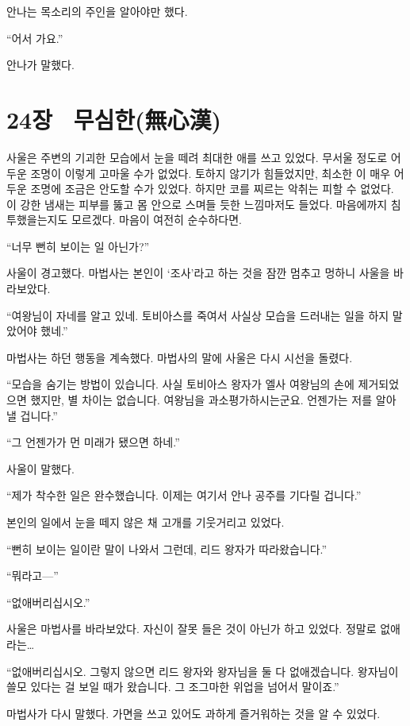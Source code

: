 안나는 목소리의 주인을 알아야만 했다.

``어서 가요.''

안나가 말했다.



\chapter[24장  무심한(無心漢)][24장\hspace*{.5em}무심한(無心漢)]{24장 \ 무심한(無心漢)}



사울은 주변의 기괴한 모습에서 눈을 떼려 최대한 애를 쓰고 있었다. 무서울 정도로 어두운 조명이 이렇게 고마울 수가 없었다. 토하지 않기가 힘들었지만, 최소한 이 매우 어두운 조명에 조금은 안도할 수가 있었다. 하지만 코를 찌르는 악취는 피할 수 없었다. 이 강한 냄새는 피부를 뚫고 몸 안으로 스며들 듯한 느낌마저도 들었다. 마음에까지 침투했을는지도 모르겠다. 마음이 여전히 순수하다면.

``너무 뻔히 보이는 일 아닌가?''

사울이 경고했다. 마법사는 본인이 `조사'라고 하는 것을 잠깐 멈추고 멍하니 사울을 바라보았다.

``여왕님이 자네를 알고 있네. 토비아스를 죽여서 사실상 모습을 드러내는 일을 하지 말았어야 했네.''

마법사는 하던 행동을 계속했다. 마법사의 말에 사울은 다시 시선을 돌렸다.

``모습을 숨기는 방법이 있습니다. 사실 토비아스 왕자가 엘사 여왕님의 손에 제거되었으면 했지만, 별 차이는 없습니다. 여왕님을 과소평가하시는군요. 언젠가는 저를 알아낼 겁니다.''

``그 언젠가가 먼 미래가 됐으면 하네.''

사울이 말했다.

``제가 착수한 일은 완수했습니다. 이제는 여기서 안나 공주를 기다릴 겁니다.''

본인의 일에서 눈을 떼지 않은 채 고개를 기웃거리고 있었다.

``뻔히 보이는 일이란 말이 나와서 그런데, 리드 왕자가 따라왔습니다.''

``뭐라고—''

``없애버리십시오.''

사울은 마법사를 바라보았다. 자신이 잘못 들은 것이 아닌가 하고 있었다. 정말로 없애라는\ldots

``없애버리십시오. 그렇지 않으면 리드 왕자와 왕자님을 둘 다 없애겠습니다. 왕자님이 쓸모 있다는 걸 보일 때가 왔습니다. 그 조그마한 위업을 넘어서 말이죠.''

마법사가 다시 말했다. 가면을 쓰고 있어도 과하게 즐거워하는 것을 알 수 있었다.

